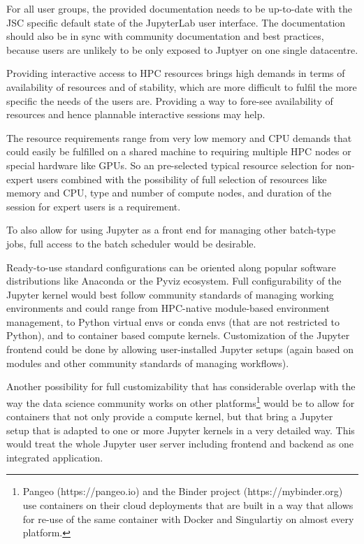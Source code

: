 For all user groups, the provided documentation needs to be up-to-date with the JSC specific default state of the JupyterLab user interface.
The documentation should also be in sync with community documentation and best practices, because users are unlikely to be only exposed to Juptyer on one single datacentre.

Providing interactive access to HPC resources brings high demands in terms of availability of resources and of stability, which are more difficult to fulfil the more specific the needs of the users are.
Providing a way to fore-see availability of resources and hence plannable interactive sessions may help.

The resource requirements range from very low memory and CPU demands that could easily be fulfilled on a shared machine to requiring multiple HPC nodes or special hardware like GPUs.
So an pre-selected typical resource selection for non-expert users combined with the possibility of full selection of resources like memory and CPU, type and number of compute nodes, and duration of the session for expert users is a requirement.

To also allow for using Jupyter as a front end for managing other batch-type jobs, full access to the batch scheduler would be desirable.

Ready-to-use standard configurations can be oriented along popular software distributions like Anaconda or the Pyviz ecosystem. 
Full configurability of the Jupyter kernel would best follow community standards of managing working environments and could range from HPC-native module-based environment management, to Python virtual envs or conda envs (that are not restricted to Python), and to container based compute kernels.
Customization of the Jupyter frontend could be done by allowing user-installed Jupyter setups (again based on modules and other community standards of managing workflows).

Another possibility for full customizability that has considerable overlap with the way the data science community works on other platforms\footnote{Pangeo (https://pangeo.io) and the Binder project (https://mybinder.org) use containers on their cloud deployments that are built in a way that allows for re-use of the same container with Docker and Singulartiy on almost every platform.} would be to allow for containers that not only provide a compute kernel, but that bring a Jupyter setup that is adapted to one or more Jupyter kernels in a very detailed way.
This would treat the whole Jupyter user server including frontend and backend as one integrated application.

